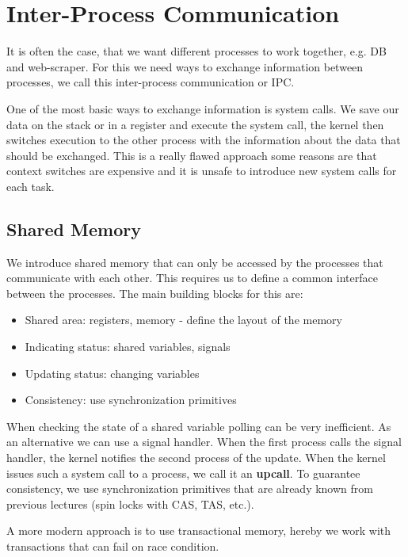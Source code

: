 \section{Inter-Process Communication}

It is often the case, that we want different processes to work together, e.g. DB and web-scraper. For this we need ways to exchange information between processes, we call this inter-process communication or IPC.\medskip

One of the most basic ways to exchange information is system calls. We save our data on the stack or in a register and execute the system call, the kernel then switches execution to the other process with the information about the data that should be exchanged. This is a really flawed approach some reasons are that context switches are expensive and it is unsafe to introduce new system calls for each task.

\subsection{Shared Memory}

We introduce shared memory that can only be accessed by the processes that communicate with each other. This requires us to define a common interface between the processes. The main building blocks for this are:
\begin{itemize}
	\item Shared area: registers, memory - define the layout of the memory
	\item Indicating status: shared variables, signals
	\item Updating status: changing variables
	\item Consistency: use synchronization primitives
\end{itemize}

When checking the state of a shared variable polling can be very inefficient. As an alternative we can use a signal handler. When the first process calls the signal handler, the kernel notifies the second process of the update. When the kernel issues such a system call to a process, we call it an \textbf{upcall}. To guarantee consistency, we use synchronization primitives that are already known from previous lectures (spin locks with CAS, TAS, etc.). \medskip

A more modern approach is to use transactional memory, hereby we work with transactions that can fail on race condition.
